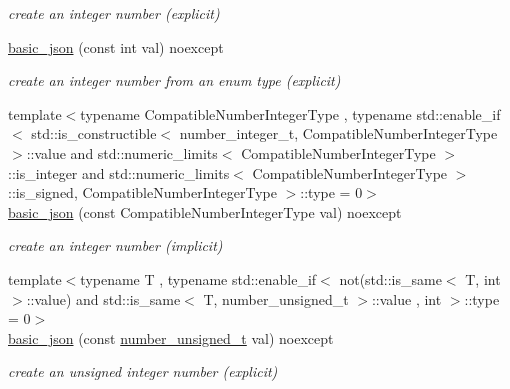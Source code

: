 \begin{DoxyCompactItemize}
\begin{DoxyCompactList}\small\item\em create an integer number (explicit) \end{DoxyCompactList}\item 
\hyperlink{a00025_a70ae1f0747f5b7a89979512866474f1a}{basic\+\_\+json} (const int val) noexcept
\begin{DoxyCompactList}\small\item\em create an integer number from an enum type (explicit) \end{DoxyCompactList}\item 
{\footnotesize template$<$typename Compatible\+Number\+Integer\+Type , typename std\+::enable\+\_\+if$<$                                                              std\+::is\+\_\+constructible$<$ number\+\_\+integer\+\_\+t, Compatible\+Number\+Integer\+Type $>$\+::value and                                                           std\+::numeric\+\_\+limits$<$ Compatible\+Number\+Integer\+Type $>$\+::is\+\_\+integer and                                                           std\+::numeric\+\_\+limits$<$ Compatible\+Number\+Integer\+Type $>$\+::is\+\_\+signed,                                                           Compatible\+Number\+Integer\+Type $>$\+::type  = 0$>$ }\\\hyperlink{a00025_ad2eddc2c13ab084f067eaba65d381ad2}{basic\+\_\+json} (const Compatible\+Number\+Integer\+Type val) noexcept
\begin{DoxyCompactList}\small\item\em create an integer number (implicit) \end{DoxyCompactList}\item 
{\footnotesize template$<$typename T , typename std\+::enable\+\_\+if$<$                                                              not(std\+::is\+\_\+same$<$ T, int $>$\+::value)                                                           and std\+::is\+\_\+same$<$ T, number\+\_\+unsigned\+\_\+t $>$\+::value                                                           , int $>$\+::type  = 0$>$ }\\\hyperlink{a00025_a85b09b03916d3d1e73373f49cdd4136d}{basic\+\_\+json} (const \hyperlink{a00025_a60a04166c122072ab11eaf9845d9cd1d}{number\+\_\+unsigned\+\_\+t} val) noexcept
\begin{DoxyCompactList}\small\item\em create an unsigned integer number (explicit) \end{DoxyCompactList}\item 

\end{DoxyCompactItemize}
